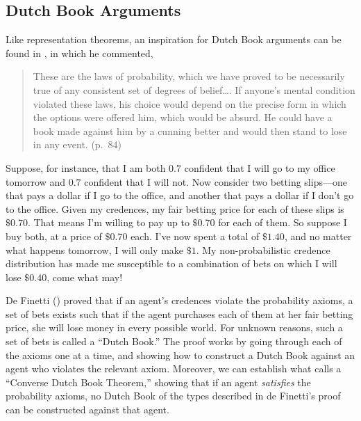 \subsection{Dutch Book Arguments}
Like representation theorems, an inspiration for Dutch Book arguments can be found in , in which he commented,
\begin{quote}
These are the laws of probability, which we have proved to be necessarily true of any consistent set of degrees of belief\ldots. If anyone's mental condition violated these laws, his choice would depend on the precise form in which the options were offered him, which would be absurd. He could have a book made against him by a cunning better and would then stand to lose in any event. (p.\ 84)
\end{quote}

Suppose, for instance, that I am both $0.7$ confident that I will go to my office tomorrow and $0.7$ confident that I will not. Now consider two betting slips---one that pays a dollar if I go to the office, and another that pays a dollar if I don't go to the office. Given my credences, my fair betting price for each of these slips is $\$0.70$. That means I'm willing to pay up to $\$0.70$ for each of them. So suppose I buy both, at a price of $\$0.70$ each. I've now spent a total of $\$1.40$, and no matter what happens tomorrow, I will only make $\$1$. My non-probabilistic credence distribution has made me susceptible to a combination of bets on which I will lose $\$0.40$, come what may!

De Finetti (\citeyear{deFinettiForesight}) proved that if an agent's credences violate the probability axioms, a set of bets exists such that if the agent purchases each of them at her fair betting price, she will lose money in every possible world. For unknown reasons, such a set of bets is called a ``Dutch Book.'' The proof works by going through each of the axioms one at a time, and showing how to construct a Dutch Book against an agent who violates the relevant axiom. Moreover, we can establish what \citet{HajekArguments} calls a ``Converse Dutch Book Theorem,'' showing that if an agent \emph{satisfies} the probability axioms, no Dutch Book of the types described in de Finetti's proof can be constructed against that agent.

